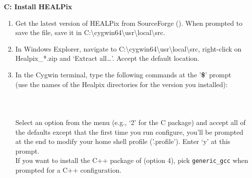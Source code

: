 \documentclass[12pt,twoside]{article}
\begin{document}
\textbf{C: Install HEALPix}
\begin{enumerate}
	\setlength{\itemsep}{-1pt}
	\setlength{\parsep}{-10pt}
\item
  Get the latest version of HEALPix from SourceForge
  (). When
  prompted to save the file, save it in
  C:\textbackslash{}cygwin64\textbackslash{}usr\textbackslash{}local\textbackslash{}src.
\item
  In Windows Explorer, navigate to
  C:\textbackslash{}cygwin64\textbackslash{}usr\textbackslash{}local\textbackslash{}src,
  right-click on Healpix\_*.zip and `Extract all\ldots{}'. Accept the
  default location.
\item
  In the Cygwin terminal, type the following commands at the
  '\textbf{\$}' prompt\\ (use the names of the Healpix directories for
  the version you installed):\\ 
	\\ 
	\\ 
	\\ 
	Select an option from the menu (e.g., `2' for the C
  package) and accept all of the defaults except that
  the first time
  you run configure, you'll be prompted at the end to modify your
  home shell profile ('.profile'). Enter `y' at this prompt.\\
  If you want to install the C++ package of \healpix (option 4), pick {\tt generic\_gcc} when prompted for a C++ configuration.\\
  	\\ 
	\\ 
\end{enumerate}
\end{document}
